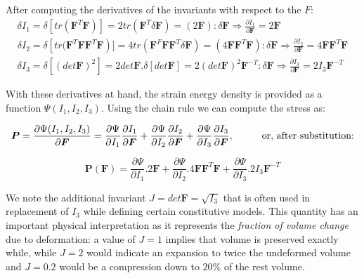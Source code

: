 After computing the derivatives of the invariants with respect to the $F$:
\begin{gather*}
 \delta I_1= \delta\left[tr(\boldsymbol{F}^T\boldsymbol{F})\right]=2tr(\boldsymbol{F}^T\delta\boldsymbol{F})=(2\boldsymbol{F}):\delta\boldsymbol{F}\Rightarrow
 \frac{\partial I_1}{\partial\boldsymbol{F}}=2\boldsymbol{F}\\
 \delta I_2 = \delta \left[ tr(\boldsymbol{F}^T\boldsymbol{F}\boldsymbol{F}^T\boldsymbol{F}\right)]=4tr(\boldsymbol{F}^F\boldsymbol{F}\boldsymbol{F}^T\delta\boldsymbol{F})=
 (4\boldsymbol{F}\boldsymbol{F}^T\boldsymbol{F}):\delta\boldsymbol{F} \Rightarrow \frac{\partial I_2}{\partial \boldsymbol{F}}=4\boldsymbol{F}\boldsymbol{F}^T\boldsymbol{F} \\
 \delta I_3=\delta \left[(det \boldsymbol{F})^2\right] = 2det\boldsymbol{F}.\delta\left[det \boldsymbol{F} \right] = 2(det \boldsymbol{F})^2\boldsymbol{F}^{-T}:\delta\boldsymbol{F} \Rightarrow
 \frac{\partial I_3}{\partial \boldsymbol{F}}=2I_3\boldsymbol{F}^{-T}
\end{gather*}

With these derivatives at hand, the strain energy density is provided as a function $\Psi(I_1, I_2, I_3)$. Using the chain rule we can compute the stress as:

\begin{align}
 \boldsymbol{P}=\frac{\partial \Psi(I_1, I_2, I_3)}{\partial\boldsymbol{F}}=
 \frac{\partial \Psi}{\partial I_1}\frac{\partial I_1}{\partial \boldsymbol{F}}+
 \frac{\partial \Psi}{\partial I_2}\frac{\partial I_2}{\partial \boldsymbol{F}}+
 \frac{\partial \Psi}{\partial I_3}\frac{\partial I_3}{\partial \boldsymbol{F}},
 \hspace{10mm}\text{or, after substitution:}\nonumber
\end{align}

\begin{equation}
\label{eq:stresspBasedOnInvariants}
 \boldsymbol{P}(\boldsymbol{F})=\frac{\partial \Psi}{\partial I_1}.2\boldsymbol{F} + 
 \frac{\partial \Psi}{\partial I_2}.4\boldsymbol{F}\boldsymbol{F}^T\boldsymbol{F} +
 \frac{\partial \Psi}{\partial I_3}.2 I_3\boldsymbol{F}^{-T}
\end{equation}

We note the additional invariant $J=det \boldsymbol{F}=\sqrt{I_3}$ that is often used in replacement of $I_3$ while defining certain constitutive models.
This quantity has an important physical interpretation as it represents the \textit{fraction of volume change} due to deformation:
a value of $J=1$ implies that volume is preserved exactly while, while $J=2$ would indicate an expansion to twice the undeformed volume and $J=0.2$
would be a compression down to $20\%$ of the rest volume.


